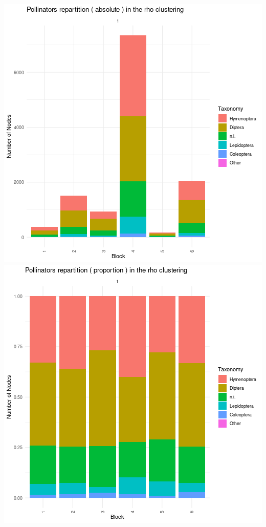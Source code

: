 \includegraphics{./img/35ffbce157e0b3bb2a32af4dbc7faa201c946a6b.png}\includegraphics{./img/62d45913b19d56f0ab48a367e53b8ed8fa83c2cc.png}

